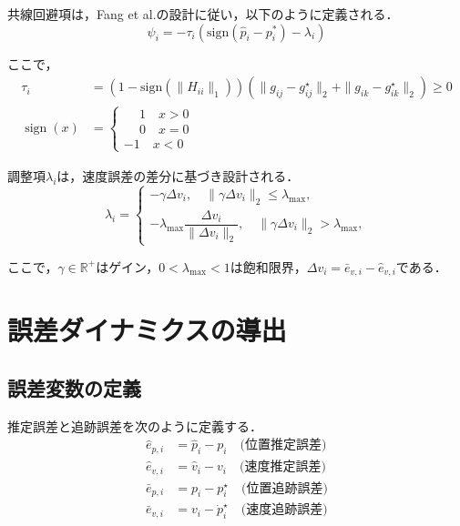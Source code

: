 \documentclass[a4paper]{jarticle}
\theoremstyle{definition}
\theoremstyle{remark}
\numberwithin{equation}{section}
\begin{document}
	共線回避項は，Fang et al.\cite{SD}の設計に従い，以下のように定義される．
	\begin{equation}
		\psi_i = -\tau_i(\mathrm{sign}(\hat{p}_i - p_i^*) - \lambda_i)
		\label{eq:psi}
	\end{equation}
	
	ここで，
	\begin{align}
		\tau_i &= (1 - \mathrm{sign}(\|H_{ii}\|_1))(\|{g}_{ij} - {g}_{ij}^\star\|_2 + \|{g}_{ik} - {g}_{ik}^\star\|_2) \ge 0 \label{eq:tau}\\
		\operatorname{sign} (x) &=
		\begin{cases}
			\phantom{-}1 \quad x > 0 \\
			\phantom{-}0 \quad x = 0 \\
			-1 \quad x < 0
		\end{cases}		
	\end{align}
	
	調整項$\lambda_i$は，速度誤差の差分に基づき設計される．
	\begin{equation}
		\lambda_i =
		\begin{cases}
			-\gamma \Delta v_i, \quad \|\gamma \Delta v_i\|_2 \le \lambda_{\max}, \\
			-\lambda_{\max} \dfrac{\Delta v_i}{\|\Delta v_i\|_2}, \quad \|\gamma \Delta v_i\|_2 > \lambda_{\max},
		\end{cases}
		\label{eq:lambda}
	\end{equation}
	
	ここで，$\gamma \in \mathbb{R}^+$はゲイン，$0 < \lambda_{\max} < 1$は飽和限界，$\Delta v_i = \bar{e}_{v,i} - \hat{e}_{v,i}$である．
	
	\section{誤差ダイナミクスの導出}
	\subsection{誤差変数の定義}
	
	推定誤差と追跡誤差を次のように定義する．
	\begin{align}
		\hat{e}_{p,i} &= \hat{p}_i - p_i \quad \text{(位置推定誤差)}\\
		\hat{e}_{v,i} &= \hat{v}_i - v_i \quad \text{(速度推定誤差)}\\
		\bar{e}_{p,i} &= p_i - p_i^\star \quad \text{(位置追跡誤差)}\\
		\bar{e}_{v,i} &= v_i - \dot{p}_i^\star \quad \text{(速度追跡誤差)}
	\end{align}
	
\end{document}
